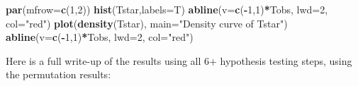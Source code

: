 \documentclass[]{book}
\newenvironment{Shaded}{\begin{snugshade}}{\end{snugshade}}
\newcommand{\KeywordTok}[1]{\textcolor[rgb]{0.13,0.29,0.53}{\textbf{#1}}}
\newcommand{\DataTypeTok}[1]{\textcolor[rgb]{0.13,0.29,0.53}{#1}}
\newcommand{\DecValTok}[1]{\textcolor[rgb]{0.00,0.00,0.81}{#1}}
\newcommand{\StringTok}[1]{\textcolor[rgb]{0.31,0.60,0.02}{#1}}
\newcommand{\OperatorTok}[1]{\textcolor[rgb]{0.81,0.36,0.00}{\textbf{#1}}}
\newcommand{\NormalTok}[1]{#1}
\theoremstyle{definition}
\theoremstyle{definition}
\theoremstyle{remark}
\begin{document}
\begin{Shaded}
\begin{Highlighting}[]
\KeywordTok{par}\NormalTok{(}\DataTypeTok{mfrow=}\KeywordTok{c}\NormalTok{(}\DecValTok{1}\NormalTok{,}\DecValTok{2}\NormalTok{))}
\KeywordTok{hist}\NormalTok{(Tstar,}\DataTypeTok{labels=}\NormalTok{T)}
\KeywordTok{abline}\NormalTok{(}\DataTypeTok{v=}\KeywordTok{c}\NormalTok{(}\OperatorTok{-}\DecValTok{1}\NormalTok{,}\DecValTok{1}\NormalTok{)}\OperatorTok{*}\NormalTok{Tobs, }\DataTypeTok{lwd=}\DecValTok{2}\NormalTok{, }\DataTypeTok{col=}\StringTok{"red"}\NormalTok{)}
\KeywordTok{plot}\NormalTok{(}\KeywordTok{density}\NormalTok{(Tstar), }\DataTypeTok{main=}\StringTok{"Density curve of Tstar"}\NormalTok{)}
\KeywordTok{abline}\NormalTok{(}\DataTypeTok{v=}\KeywordTok{c}\NormalTok{(}\OperatorTok{-}\DecValTok{1}\NormalTok{,}\DecValTok{1}\NormalTok{)}\OperatorTok{*}\NormalTok{Tobs, }\DataTypeTok{lwd=}\DecValTok{2}\NormalTok{, }\DataTypeTok{col=}\StringTok{"red"}\NormalTok{)}
\end{Highlighting}
\end{Shaded}

Here is a full write-up of the results using all 6+ hypothesis testing
steps, using the permutation results:
\end{document}
